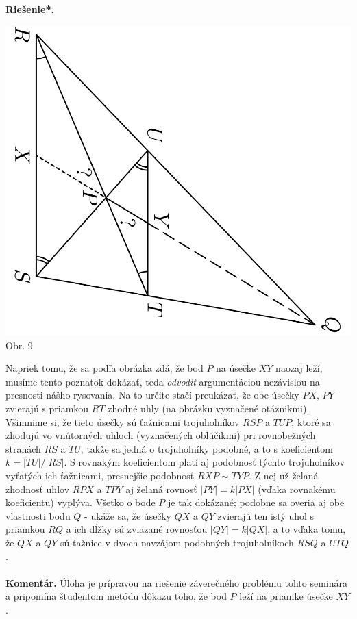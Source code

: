 \documentclass[11pt,a4paper,oneside,final]{book}
\newcommand{\kom}{\textbf{Komentár.} }
\newcommand{\rieh}{\textbf{Riešenie*.} }
\begin{document}
\rieh
\begin{center}
\includegraphics[scale=0.3, angle=90]{66D51}\\

Obr. 9
\end{center}
Napriek tomu, že sa podľa obrázka zdá, že bod $P$ na úsečke $XY$ naozaj leží, musíme tento poznatok dokázať, teda \textit{odvodiť} argumentáciou nezávislou na presnosti nášho rysovania. Na to určite stačí preukázať, že obe úsečky $PX$, $PY$ zvierajú s priamkou $RT$ zhodné uhly (na obrázku vyznačené otáznikmi). Všimnime si, že tieto úsečky sú ťažnicami trojuholníkov $RSP$ a $TUP$, ktoré sa zhodujú vo vnútorných uhloch (vyznačených oblúčikmi) pri rovnobežných stranách $RS$ a $TU$, takže sa jedná o trojuholníky podobné, a to s koeficientom $k = |TU|/|RS|$. S rovnakým koeficientom platí aj podobnosť  týchto trojuholníkov vyťatých ich ťažnicami, presnejšie podobnosť $RXP \sim TYP$. Z nej už želaná zhodnosť uhlov $RPX$ a $TPY$ aj želaná rovnosť $|PY | = k|PX|$ (vďaka rovnakému koeficientu) vyplýva. Všetko o bode $P$ je tak dokázané; podobne sa overia aj obe vlastnosti bodu $Q$ - ukáže sa, že úsečky $QX$ a $QY$ zvierajú ten istý uhol s priamkou $RQ$ a ich dĺžky sú zviazané rovnosťou $|QY | = k|QX|$, a to vďaka tomu, že $QX$ a $QY$ sú ťažnice v dvoch navzájom podobných trojuholníkoch $RSQ$ a $UTQ$.\\
\\
\kom Úloha je prípravou na riešenie záverečného problému tohto seminára a pripomína študentom metódu dôkazu toho, že bod $P$ leží na priamke úsečke $XY$.\\
\end{document}
